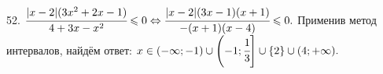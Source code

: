 52. $\cfrac{|x-2|(3x^2+2x-1)}{4+3x-x^2}\leqslant0\Leftrightarrow\cfrac{|x-2|(3x-1)(x+1)}{-(x+1)(x-4)}\leqslant0.$ Применив метод интервалов, найдём ответ: $x\in(-\infty;-1)\cup\left(-1;\cfrac{1}{3}\right]\cup\{2\}\cup(4;+\infty).$
\begin{figure}[ht!]
\end{figure}\\
